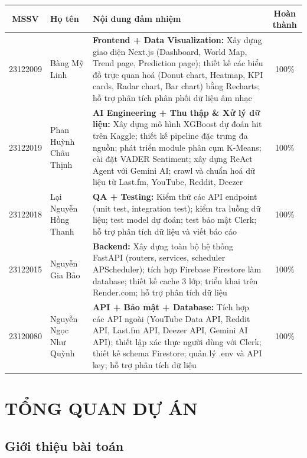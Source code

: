 \documentclass[12pt,a4paper]{report}
\begin{document}
\begin{tabularx}{\textwidth}{|c|l|X|c|}
\hline
\textbf{MSSV} & \textbf{Họ tên} & \textbf{Nội dung đảm nhiệm} & \textbf{Hoàn thành} \\
\hline
23122009 & Bàng Mỹ Linh &
    \textbf{Frontend + Data Visualization:} Xây dựng giao diện Next.js (Dashboard, World Map, Trend page, Prediction page); thiết kế các biểu đồ trực quan hoá (Donut chart, Heatmap, KPI cards, Radar chart, Bar chart) bằng Recharts; hỗ trợ phân tích phân phối dữ liệu âm nhạc
    & 100\% \\
\hline
23122019 & Phan Huỳnh Châu Thịnh &
    \textbf{AI Engineering + Thu thập \& Xử lý dữ liệu:} Xây dựng mô hình XGBoost dự đoán hit trên Kaggle; thiết kế pipeline đặc trưng đa nguồn; phát triển module phân cụm K-Means; cài đặt VADER Sentiment; xây dựng ReAct Agent với Gemini AI; crawl và chuẩn hoá dữ liệu từ Last.fm, YouTube, Reddit, Deezer
    & 100\% \\
\hline
23122018 & Lại Nguyễn Hồng Thanh &
    \textbf{QA + Testing:} Kiểm thử các API endpoint (unit test, integration test); kiểm tra luồng dữ liệu; test model dự đoán; test bảo mật Clerk; hỗ trợ phân tích dữ liệu và viết báo cáo
    & 100\% \\
\hline
23122015 & Nguyễn Gia Bảo &
    \textbf{Backend:} Xây dựng toàn bộ hệ thống FastAPI (routers, services, scheduler APScheduler); tích hợp Firebase Firestore làm database; thiết kế cache 3 lớp; triển khai trên Render.com; hỗ trợ phân tích dữ liệu
    & 100\% \\
\hline
23120080 & Nguyễn Ngọc Như Quỳnh &
    \textbf{API + Bảo mật + Database:} Tích hợp các API ngoài (YouTube Data API, Reddit API, Last.fm API, Deezer API, Gemini AI API); thiết lập xác thực người dùng với Clerk; thiết kế schema Firestore; quản lý .env và API key; hỗ trợ phân tích dữ liệu
    & 100\% \\
\hline
\end{tabularx}

\chapter{TỔNG QUAN DỰ ÁN}

\section{Giới thiệu bài toán}
\end{document}
